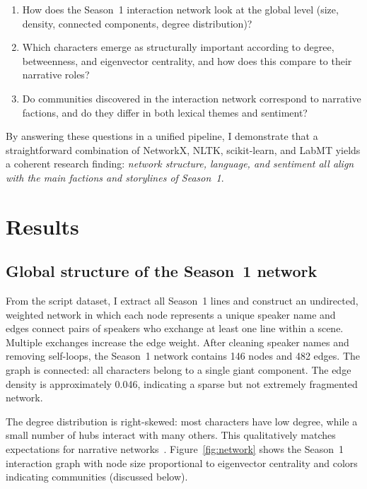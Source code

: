 \documentclass[9pt,twocolumn,twoside]{pnas-new}
\begin{document}
\begin{enumerate}
    \item How does the Season~1 interaction network look at the global level (size, density, connected components, degree distribution)?
    \item Which characters emerge as structurally important according to degree, betweenness, and eigenvector centrality, and how does this compare to their narrative roles?
    \item Do communities discovered in the interaction network correspond to narrative factions, and do they differ in both lexical themes and sentiment?
\end{enumerate}

By answering these questions in a unified pipeline, I demonstrate that a straightforward combination of NetworkX, NLTK, scikit-learn, and LabMT yields a coherent research finding: \emph{network structure, language, and sentiment all align with the main factions and storylines of Season~1}.


\section*{Results}

\subsection*{Global structure of the Season~1 network}

From the script dataset, I extract all Season~1 lines and construct an undirected, weighted network in which each node represents a unique speaker name and edges connect pairs of speakers who exchange at least one line within a scene. Multiple exchanges increase the edge weight. After cleaning speaker names and removing self-loops, the Season~1 network contains 146 nodes and 482 edges. The graph is connected: all characters belong to a single giant component. The edge density is approximately 0.046, indicating a sparse but not extremely fragmented network.

The degree distribution is right-skewed: most characters have low degree, while a small number of hubs interact with many others. This qualitatively matches expectations for narrative networks~\cite{newman2010}. Figure~\ref{fig:network} shows the Season~1 interaction graph with node size proportional to eigenvector centrality and colors indicating communities (discussed below).
\end{document}
